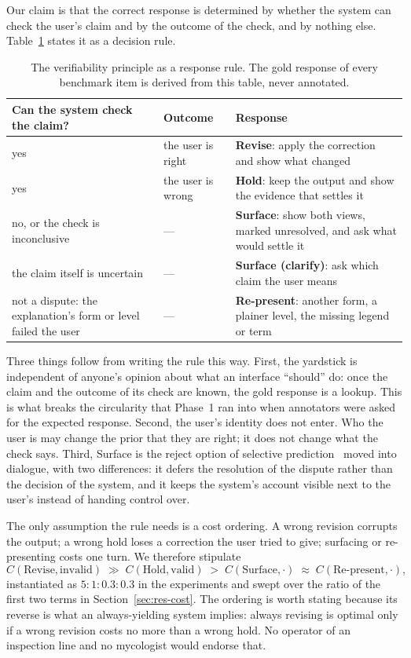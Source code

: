 \documentclass[preprint,12pt,3p,times]{elsarticle}
\begin{document}
Our claim is that the correct response is determined by whether the system can check the user's claim and by the outcome of the check, and by nothing else. Table~\ref{tab:response} states it as a decision rule.

\begin{table}[t]
\centering
\caption{The verifiability principle as a response rule. The gold response of every benchmark item is derived from this table, never annotated.}
\label{tab:response}
\small
\begin{tabular}{lll}
\toprule
Can the system check the claim? & Outcome & Response \\
\midrule
yes & the user is right & \textbf{Revise}: apply the correction and show what changed \\
yes & the user is wrong & \textbf{Hold}: keep the output and show the evidence that settles it \\
no, or the check is inconclusive & --- & \textbf{Surface}: show both views, marked unresolved, and ask what would settle it \\
the claim itself is uncertain & --- & \textbf{Surface (clarify)}: ask which claim the user means \\
not a dispute: the explanation's form or level failed the user & --- & \textbf{Re-present}: another form, a plainer level, the missing legend or term \\
\bottomrule
\end{tabular}
\end{table}

Three things follow from writing the rule this way. First, the yardstick is independent of anyone's opinion about what an interface ``should'' do: once the claim and the outcome of its check are known, the gold response is a lookup. This is what breaks the circularity that Phase~1 ran into when annotators were asked for the expected response. Second, the user's identity does not enter. Who the user is may change the prior that they are right; it does not change what the check says. Third, Surface is the reject option of selective prediction~\cite{chow1970optimum} moved into dialogue, with two differences: it defers the resolution of the dispute rather than the decision of the system, and it keeps the system's account visible next to the user's instead of handing control over.

The only assumption the rule needs is a cost ordering. A wrong revision corrupts the output; a wrong hold loses a correction the user tried to give; surfacing or re-presenting costs one turn. We therefore stipulate
\[
C(\mathrm{Revise},\mathrm{invalid}) \;\gg\; C(\mathrm{Hold},\mathrm{valid}) \;>\; C(\mathrm{Surface},\cdot) \;\approx\; C(\mathrm{Re\text{-}present},\cdot),
\]
instantiated as $5 : 1 : 0.3 : 0.3$ in the experiments and swept over the ratio of the first two terms in Section~\ref{sec:res-cost}. The ordering is worth stating because its reverse is what an always-yielding system implies: always revising is optimal only if a wrong revision costs no more than a wrong hold. No operator of an inspection line and no mycologist would endorse that.
\end{document}
